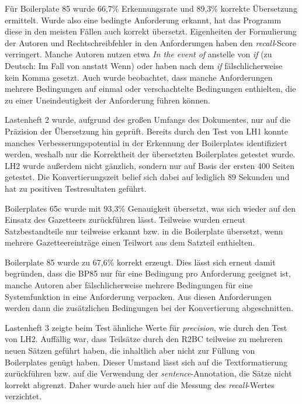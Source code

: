 \documentclass[12pt]{report}
\begin{document}
Für Boilerplate 85 wurde 66,7\% Erkennungsrate und 89,3\% korrekte Übersetzung ermittelt. Wurde also eine bedingte Anforderung erkannt, hat das Programm diese in den meisten Fällen auch korrekt übersetzt. Eigenheiten der Formulierung der Autoren und Rechtschreibfehler in den Anforderungen haben den \textit{recall}-Score verringert. Manche Autoren nutzen etwa \glqq \textit{In the event of}\grqq{} anstelle von \glqq \textit{if}\grqq{} (zu Deutsch: \glqq Im Fall von\grqq{} anstatt \glqq Wenn\grqq{}) oder haben nach dem \textit{if} fälschlicherweise kein Komma gesetzt. Auch wurde beobachtet, dass manche Anforderungen mehrere Bedingungen auf einmal oder verschachtelte Bedingungen enthielten, die zu einer Uneindeutigkeit der Anforderung führen können.

\vspace{12pt}
Lastenheft 2 wurde, aufgrund des großen Umfangs des Dokumentes, nur auf die Präzision der Übersetzung hin geprüft. Bereits durch den Test von LH1 konnte manches Verbesserungspotential in der Erkennung der Boilerplates identifiziert werden, weshalb nur die Korrektheit der übersetzten Boilerplates getestet wurde. LH2 wurde außerdem nicht gänzlich, sondern nur auf Basis der ersten 400 Seiten getestet. Die Konvertierungszeit belief sich dabei auf lediglich 89 Sekunden und hat zu positiven Testresultaten geführt.

Boilerplates 65c wurde mit 93,3\% Genauigkeit übersetzt, was sich wieder auf den Einsatz des Gazetteers zurückführen lässt. Teilweise wurden erneut Satzbestandteile nur teilweise erkannt bzw. in die Boilerplate übersetzt, wenn mehrere Gazetteereinträge einen Teilwort aus dem Satzteil enthielten.

Boilerplate 85 wurde zu 67,6\% korrekt erzeugt. Dies lässt sich erneut damit begründen, dass die BP85 nur für eine Bedingung pro Anforderung geeignet ist, manche Autoren aber fälschlicherweise mehrere Bedingungen für eine Systemfunktion in eine Anforderung verpacken. Aus diesen Anforderungen werden dann die zusätzlichen Bedingungen bei der Konvertierung abgeschnitten.

\vspace{12pt}
Lastenheft 3 zeigte beim Test ähnliche Werte für \textit{precision}, wie durch den Test von LH2. Auffällig war, dass Teilsätze durch den R2BC teilweise zu mehreren neuen Sätzen geführt haben, die inhaltlich aber nicht zur Füllung von Boilerplates genügt haben. Dieser Umstand lässt sich auf die Textformatierung zurückführen bzw. auf die Verwendung der \textit{sentence}-Annotation, die Sätze nicht korrekt abgrenzt. Daher wurde auch hier auf die Messung des \textit{recall}-Wertes verzichtet.
\end{document}
